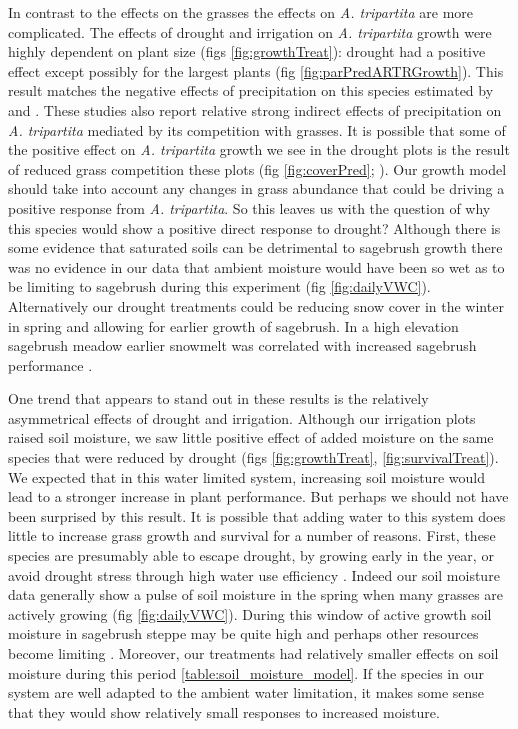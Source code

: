 \documentclass[11pt]{article}
\begin{document}
\begin{doublespacing}
In contrast to the effects on the grasses the effects on \textit{A. tripartita} are more complicated. The effects of drought and irrigation on \textit{A. tripartita} growth were highly dependent on plant size (figs \ref{fig:growthTreat}): drought had a positive effect except possibly for the largest plants (fig \ref{fig:parPredARTRGrowth}). This result matches the negative effects of precipitation on this species estimated by \citep{adler_forecasting_2012} and \citep{chu_direct_2016}. These studies also report relative strong indirect effects of precipitation on \textit{A. tripartita} mediated by its competition with grasses. It is possible that some of the positive effect on \textit{A. tripartita} growth we see in the drought plots is the result of reduced grass competition these plots (fig \ref{fig:coverPred}; \citep{chu_direct_2016}). Our growth model should take into account any changes in grass abundance that could be driving a positive response from \textit{A. tripartita}. So this leaves us with the question of why this species would show a positive direct response to drought? Although there is some evidence that saturated soils can be detrimental to sagebrush growth \citep{} there was no evidence in our data that ambient moisture would have been so wet as to be limiting to sagebrush during this experiment (fig \ref{fig:dailyVWC}). Alternatively our drought treatments could be reducing snow cover in the winter in spring and allowing for earlier growth of sagebrush.  In a high elevation sagebrush meadow earlier snowmelt was correlated with increased sagebrush performance \citep{harte_}. 

One trend that appears to stand out in these results is the relatively asymmetrical effects of drought and irrigation. Although our irrigation plots raised soil moisture, we saw little positive effect of added moisture on the same species that were reduced by drought (figs \ref{fig:growthTreat}, \ref{fig:survivalTreat}). We expected that in this water limited system, increasing soil moisture would lead to a stronger increase in plant performance. But perhaps we should not have been surprised by this result. It is possible that adding water to this system does little to increase grass growth and survival for a number of reasons.  First, these species are presumably able to escape drought, by growing early in the year, or avoid drought stress through high water use efficiency \citep{bazzaz, franks}. Indeed our soil moisture data generally show a pulse of soil moisture in the spring when many grasses are actively growing (fig \ref{fig:dailyVWC}). During this window of active growth soil moisture in sagebrush steppe may be quite high and perhaps other resources become limiting \citep{caldwell} \citep{ino}. Moreover, our treatments had relatively smaller effects on soil moisture during this period \ref{table:soil_moisture_model}. If the species in our system are well adapted to the ambient water limitation, it makes some sense that they would show relatively small responses to increased moisture. 


\end{doublespacing}
\end{document}
